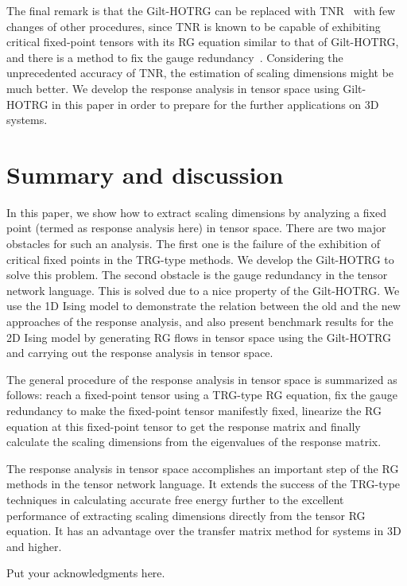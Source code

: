 \documentclass[aps,prb,reprint,superscriptaddress]{revtex4-2}
\begin{document}
The final remark is that the Gilt-HOTRG can be replaced with
TNR~\cite{tnr,tnralgo} with few changes of other procedures, since TNR
is known to be capable of exhibiting critical fixed-point tensors with
its RG equation similar to that of Gilt-HOTRG, and there is a method to
fix the gauge redundancy~\cite{tnralgo}. Considering the unprecedented
accuracy of TNR, the estimation of scaling dimensions might be much
better. We develop the response analysis in tensor space using
Gilt-HOTRG in this paper in order to prepare for the further
applications on 3D systems.
%


\section{Summary and discussion\label{conclusion}}
In this paper, we show how to extract scaling dimensions by analyzing a
fixed point (termed as response analysis here) in tensor space. There are two
major obstacles for such an analysis. The first one is the failure of
the exhibition of critical fixed points in the TRG-type methods. We develop
the Gilt-HOTRG to solve this problem. The second obstacle is the
gauge redundancy in the tensor network language. This is solved due to a
nice property of the Gilt-HOTRG.  We use the 1D Ising model to demonstrate
the relation between the old and the new approaches of the response
analysis, and also present benchmark results for the 2D Ising model
by generating RG flows in tensor space using the Gilt-HOTRG and carrying out
the response analysis in tensor space. 
%

The general procedure of the response analysis in tensor space is summarized
as follows: reach a fixed-point tensor using a TRG-type RG equation, fix
the gauge redundancy to make the fixed-point tensor manifestly fixed,
linearize the RG equation at this fixed-point tensor to get the response
matrix and finally calculate the scaling dimensions from the
eigenvalues of the response matrix.
%

The response analysis in tensor space accomplishes an important step of
the RG methods in the tensor network language. It extends the success of
the TRG-type techniques in calculating accurate free energy further to
the excellent performance of extracting scaling dimensions directly from
the tensor RG equation. It has an advantage over the transfer matrix
method for systems in 3D and higher. 




\begin{acknowledgments}
Put your acknowledgments here.

\end{acknowledgments}
\end{document}
